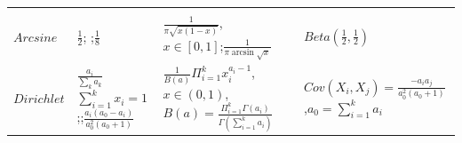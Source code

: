 \documentclass[10pt,twocolumn,portrait]{article}
\begin{document}
\begin{longtable}[]{@{}lllll@{}}
\begin{minipage}[t]{0.13\columnwidth}
\strut
\end{minipage} & \begin{minipage}[t]{0.26\columnwidth}\raggedright
\strut
\end{minipage}\tabularnewline
\begin{minipage}[t]{0.07\columnwidth}\raggedright
\(Arcsine\)\strut
\end{minipage} & \begin{minipage}[t]{0.20\columnwidth}\raggedright
\(\frac{1}2\); ;\(\frac{1}8\)\strut
\end{minipage} & \begin{minipage}[t]{0.20\columnwidth}\raggedright
\(\frac{1}{\pi\sqrt{x(1-x)}}\),\(x\in[0,1]\);\(\frac{1}{\pi\arcsin\sqrt x}\)\strut
\end{minipage} & \begin{minipage}[t]{0.13\columnwidth}\raggedright
\strut
\end{minipage} & \begin{minipage}[t]{0.26\columnwidth}\raggedright
\(Beta(\frac{1}2,\frac{1}2)\)\strut
\end{minipage}\tabularnewline
\begin{minipage}[t]{0.07\columnwidth}\raggedright
\(Dirichlet\)\strut
\end{minipage} & \begin{minipage}[t]{0.20\columnwidth}\raggedright
\(\frac{a_i}{\sum_ka_k}\)\(\sum_{i=1}^kx_i=1\);;\(\frac{a_i(a_0-a_i)}{a_0^2(a_0+1)}\)\strut
\end{minipage} & \begin{minipage}[t]{0.20\columnwidth}\raggedright
\(\frac1{B(a)}\Pi_{i=1}^kx_i^{a_i-1}\),\(x\in(0,1)\),\(B(a)=\frac{\Pi_{i=1}^k\Gamma(a_i)}{\Gamma(\sum_{i=1}^ka_i)}\)\strut
\end{minipage} & \begin{minipage}[t]{0.13\columnwidth}\raggedright
\strut
\end{minipage} & \begin{minipage}[t]{0.26\columnwidth}\raggedright
\(Cov(X_i,X_j)=\frac{-a_ia_j}{a_0^2(a_0+1)}\),\(a_0=\sum_{i=1}^ka_i\)\strut
\end{minipage}\tabularnewline
\bottomrule
\end{longtable}

\begin{landscape}


\end{landscape}
\end{document}
